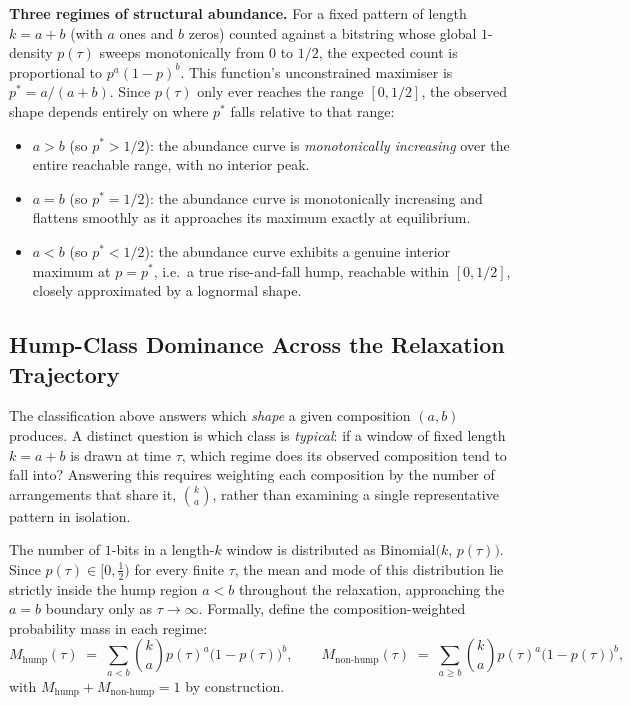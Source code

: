 \documentclass[11pt]{article}
\begin{document}
\textbf{Three regimes of structural abundance.} For a fixed pattern of length $k=a+b$ (with $a$ ones and $b$
zeros) counted against a bitstring whose global $1$-density $p(\tau)$ sweeps monotonically from $0$ to $1/2$,
the expected count is proportional to $p^a(1-p)^b$. This function's unconstrained maximiser is $p^\ast =
a/(a+b)$. Since $p(\tau)$ only ever reaches the range $[0, 1/2]$, the observed shape depends entirely on
where $p^\ast$ falls relative to that range:
\begin{itemize}
    \item $a > b$ (so $p^\ast > 1/2$): the abundance curve is \emph{monotonically increasing} over the entire
          reachable range, with no interior peak.
    \item $a = b$ (so $p^\ast = 1/2$): the abundance curve is monotonically increasing and flattens smoothly as
          it approaches its maximum exactly at equilibrium.
    \item $a < b$ (so $p^\ast < 1/2$): the abundance curve exhibits a genuine interior maximum at $p=p^\ast$,
          i.e.\ a true rise-and-fall hump, reachable within $[0,1/2]$, closely approximated by a lognormal
          shape.
\end{itemize}



\subsection{Hump-Class Dominance Across the Relaxation Trajectory}
\label{sec:hump-dominance}
 
The classification above answers which \emph{shape} a given composition $(a,b)$ produces. A distinct
question is which class is \emph{typical}: if a window of fixed length $k=a+b$ is drawn at time $\tau$, which
regime does its observed composition tend to fall into? Answering this requires weighting each composition
by the number of arrangements that share it, $\binom{k}{a}$, rather than examining a single representative
pattern in isolation.
 
The number of $1$-bits in a length-$k$ window is distributed as $\mathrm{Binomial}\bigl(k,\,p(\tau)\bigr)$.
Since $p(\tau)\in[0,\tfrac12)$ for every finite $\tau$, the mean and mode of this distribution lie strictly
inside the hump region $a<b$ throughout the relaxation, approaching the $a=b$ boundary only as
$\tau\to\infty$. Formally, define the composition-weighted probability mass in each regime:
\[
M_{\mathrm{hump}}(\tau) \;=\; \sum_{a<b} \binom{k}{a} p(\tau)^a \bigl(1-p(\tau)\bigr)^b,
\qquad
M_{\mathrm{non\text{-}hump}}(\tau) \;=\; \sum_{a\ge b} \binom{k}{a} p(\tau)^a \bigl(1-p(\tau)\bigr)^b,
\]
with $M_{\mathrm{hump}}+M_{\mathrm{non\text{-}hump}}=1$ by construction.
 
\end{document}
